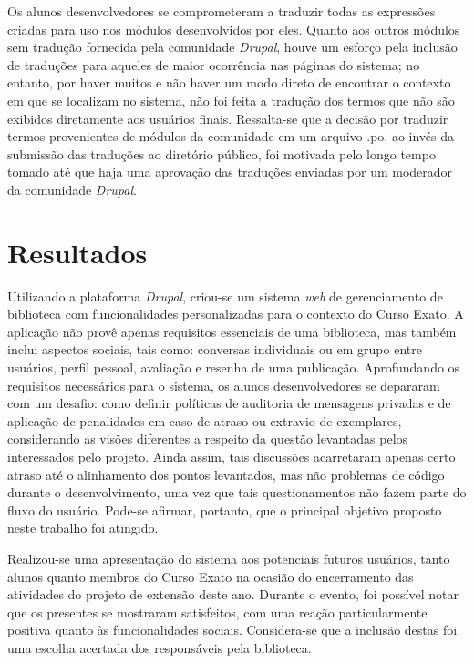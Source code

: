 \documentclass[a4paper]{article}
\begin{document}
Os alunos desenvolvedores se comprometeram a traduzir todas as expressões criadas para uso nos módulos desenvolvidos por eles. Quanto aos outros módulos sem tradução fornecida pela comunidade \textit{Drupal}, houve um esforço pela inclusão de traduções para aqueles de maior ocorrência nas páginas do sistema; no entanto, por haver muitos e não haver um modo direto de encontrar o contexto em que se localizam no sistema, não foi feita a tradução dos termos que não são exibidos diretamente aos usuários finais. Ressalta-se que a decisão por traduzir termos provenientes de módulos da comunidade em um arquivo .po, ao invés da submissão das traduções ao diretório público, foi motivada pelo longo tempo tomado até que haja uma aprovação das traduções enviadas por um moderador da comunidade \textit{Drupal}.

\section{Resultados} \label{sssec:improvements}
Utilizando a plataforma \textit{Drupal}, criou-se um sistema \textit{web} de gerenciamento de biblioteca com funcionalidades personalizadas para o contexto do Curso Exato. A aplicação não provê apenas requisitos essenciais de uma biblioteca, mas também inclui aspectos sociais, tais como: conversas individuais ou em grupo entre usuários, perfil pessoal, avaliação e resenha de uma publicação. Aprofundando os requisitos necessários para o sistema, os alunos desenvolvedores se depararam com um desafio: como definir políticas de auditoria de mensagens privadas e de aplicação de penalidades em caso de atraso ou extravio de exemplares, considerando as visões diferentes a respeito da questão levantadas pelos interessados pelo projeto. Ainda assim, tais discussões acarretaram apenas certo atraso até o alinhamento dos pontos levantados, mas não problemas de código durante o desenvolvimento, uma vez que tais questionamentos não fazem parte do fluxo do usuário. Pode-se afirmar, portanto, que o principal objetivo proposto neste trabalho foi atingido.

Realizou-se uma apresentação do sistema aos potenciais futuros usuários, tanto alunos quanto membros do Curso Exato na ocasião do encerramento das atividades do projeto de extensão deste ano. Durante o evento, foi possível notar que os presentes se mostraram satisfeitos, com uma reação particularmente positiva quanto às funcionalidades sociais. Considera-se que a inclusão destas foi uma escolha acertada dos responsáveis pela biblioteca.
\end{document}
